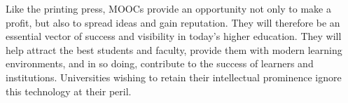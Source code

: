 Like the printing press, 
MOOCs provide an opportunity not only to make a profit, but also
to spread ideas and gain reputation. They will therefore be an
essential vector of success and visibility in today's higher
education. They will help attract the best students and
faculty, provide them with modern learning environments, and in so doing,
contribute to the success of learners and institutions.
Universities wishing to retain their intellectual
prominence ignore this technology at their peril.



